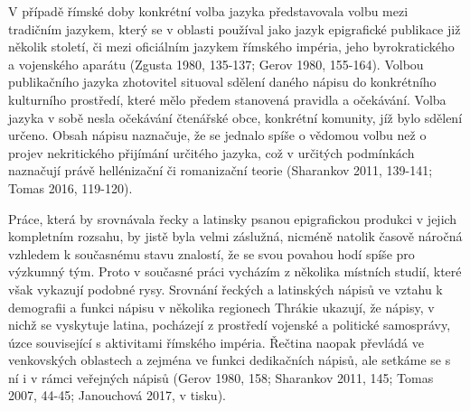 V případě římské doby konkrétní volba jazyka představovala volbu mezi tradičním jazykem, který se v oblasti používal jako jazyk epigrafické publikace již několik století, či mezi oficiálním jazykem římského impéria, jeho byrokratického a vojenského aparátu (Zgusta 1980, 135-137; Gerov 1980, 155-164). Volbou publikačního jazyka zhotovitel situoval sdělení daného nápisu do konkrétního kulturního prostředí, které mělo předem stanovená pravidla a očekávání. Volba jazyka v sobě nesla očekávání čtenářské obce, konkrétní komunity, jíž bylo sdělení určeno. Obsah nápisu naznačuje, že se jednalo spíše o vědomou volbu než o projev nekritického přijímání určitého jazyka, což v určitých podmínkách naznačují právě hellénizační či romanizační teorie (Sharankov 2011, 139-141; Tomas 2016, 119-120).

Práce, která by srovnávala řecky a latinsky psanou epigrafickou produkci v jejich kompletním rozsahu, by jistě byla velmi záslužná, nicméně natolik časově náročná vzhledem k současnému stavu znalostí, že se svou povahou hodí spíše pro výzkumný tým. Proto v současné práci vycházím z několika místních studií, které však vykazují podobné rysy. Srovnání řeckých a latinských nápisů ve vztahu k demografii a funkci nápisu v několika regionech Thrákie ukazují, že nápisy, v nichž se vyskytuje latina, pocházejí z prostředí vojenské a politické samosprávy, úzce související s aktivitami římského impéria. Řečtina naopak převládá ve venkovských oblastech a zejména ve funkci dedikačních nápisů, ale setkáme se s ní i v rámci veřejných nápisů (Gerov 1980, 158; Sharankov 2011, 145; Tomas 2007, 44-45; Janouchová 2017, v tisku).


